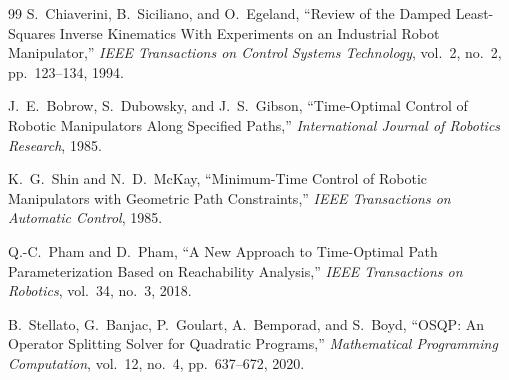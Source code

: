 \documentclass[journal]{IEEEtran}
\begin{document}
\begin{thebibliography}{99}
S.~Chiaverini, B.~Siciliano, and O.~Egeland, ``Review of the Damped
Least-Squares Inverse Kinematics With Experiments on an Industrial Robot
Manipulator,'' \emph{IEEE Transactions on Control Systems Technology},
vol.~2, no.~2, pp.~123--134, 1994.

J.~E.~Bobrow, S.~Dubowsky, and J.~S.~Gibson, ``Time-Optimal Control of
Robotic Manipulators Along Specified Paths,'' \emph{International Journal
of Robotics Research}, 1985.

K.~G.~Shin and N.~D.~McKay, ``Minimum-Time Control of Robotic Manipulators
with Geometric Path Constraints,'' \emph{IEEE Transactions on Automatic
Control}, 1985.

Q.-C.~Pham and D.~Pham, ``A New Approach to Time-Optimal Path
Parameterization Based on Reachability Analysis,'' \emph{IEEE
Transactions on Robotics}, vol.~34, no.~3, 2018.

B.~Stellato, G.~Banjac, P.~Goulart, A.~Bemporad, and S.~Boyd, ``OSQP: An
Operator Splitting Solver for Quadratic Programs,'' \emph{Mathematical
Programming Computation}, vol.~12, no.~4, pp.~637--672, 2020.

\end{thebibliography}
\end{document}
